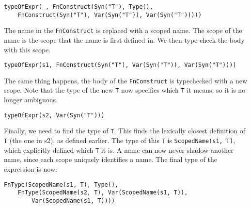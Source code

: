 \begin{lstlisting}
typeOfExpr(_, FnConstruct(Syn("T"), Type(),
	FnConstruct(Syn("T"), Var(Syn("T")), Var(Syn("T")))))
\end{lstlisting}

\noindent
The name in the \verb|FnConstruct| is replaced with a scoped name. The scope of the name is the scope that the name is first defined in. We then type check the body with this scope.

\begin{lstlisting}
typeOfExpr(s1, FnConstruct(Syn("T"), Var(Syn("T")), Var(Syn("T"))))
\end{lstlisting}


\noindent
The same thing happens, the body of the \verb|FnConstruct| is typechecked with a new scope. Note that the type of the new \verb|T| now specifies which \verb|T| it means, so it is no longer ambiguous.

\begin{lstlisting}
typeOfExpr(s2, Var(Syn("T")))
\end{lstlisting}

Finally, we need to find the type of \verb|T|. This finds the lexically closest definition of \verb|T| (the one in s2), as defined earlier. The type of this \verb|T| is \verb|ScopedName(s1, T)|, which explicitly defined which \verb|T| it is. A name can now never shadow another name, since each scope uniquely identifies a name. The final type of the expression is now:

\begin{lstlisting}
FnType(ScopedName(s1, T), Type(),
	FnType(ScopedName(s2, T), Var(ScopedName(s1, T)), 
		Var(ScopedName(s1, T))))
\end{lstlisting}

